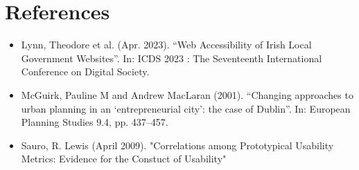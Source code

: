 \documentclass{report}
\begin{document}
\chapter*{References}
\begin{itemize}
    \item Lynn, Theodore et al. (Apr. 2023). “Web Accessibility of Irish Local Government Websites”. In: ICDS 2023 : The
          Seventeenth International Conference on Digital Society.
    \item McGuirk, Pauline M and Andrew MacLaran (2001). “Changing approaches to urban planning in an ‘entrepreneurial
          city’: the case of Dublin”. In: European Planning Studies 9.4, pp. 437–457.
    \item Sauro, R. Lewis (April 2009). "Correlations among Prototypical Usability Metrics: Evidence for the Constuct of Usability"
\end{itemize}
\listoffigures
\listoftables
\end{document}
